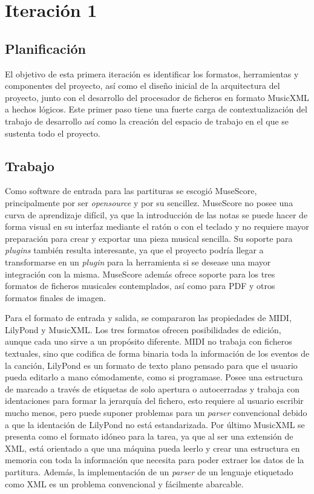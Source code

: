 \section{Iteración 1}
\subsection{Planificación}
El objetivo de esta primera iteración es identificar los formatos, herramientas y componentes del proyecto, así como el diseño inicial de la arquitectura del proyecto, junto con el desarrollo del procesador de ficheros en formato MusicXML a hechos lógicos. Este primer paso tiene una fuerte carga de contextualización del trabajo de desarrollo así como la creación del espacio de trabajo en el que se sustenta todo el proyecto.

\subsection{Trabajo}
Como software de entrada para las partituras se escogió MuseScore, principalmente por ser \textit{opensource} y por su sencillez. MuseScore no posee una curva de aprendizaje difícil, ya que la introducción de las notas se puede hacer de forma visual en su interfaz mediante el ratón o con el teclado y no requiere mayor preparación para crear y exportar una pieza musical sencilla. Su soporte para \textit{plugins} también resulta interesante, ya que el proyecto podría llegar a transformarse en un \textit{plugin} para la herramienta si se desease una mayor integración con la misma. MuseScore además ofrece soporte para los tres formatos de ficheros musicales contemplados, así como para PDF y otros formatos finales de imagen.

Para el formato de entrada y salida, se compararon las propiedades de MIDI, LilyPond y MusicXML. Los tres formatos ofrecen posibilidades de edición, aunque cada uno sirve a un propósito diferente. MIDI no trabaja con ficheros textuales, sino que codifica de forma binaria toda la información de los eventos de la canción, LilyPond es un formato de texto plano pensado para que el usuario pueda editarlo a mano cómodamente, como si programase. Posee una estructura de marcado a través de etiquetas de solo apertura o autocerradas y trabaja con identaciones para formar la jerarquía del fichero, esto requiere al usuario escribir mucho menos, pero puede suponer problemas para un \textit{parser} convencional debido a que la identación de LilyPond no está estandarizada. Por último MusicXML se presenta como el formato idóneo para la tarea, ya que al ser una extensión de XML, está orientado a que una máquina pueda leerlo y crear una estructura en memoria con toda la información que necesita para poder extraer los datos de la partitura. Además, la implementación de un \textit{parser} de un lenguaje etiquetado como XML es un problema convencional y fácilmente abarcable.

